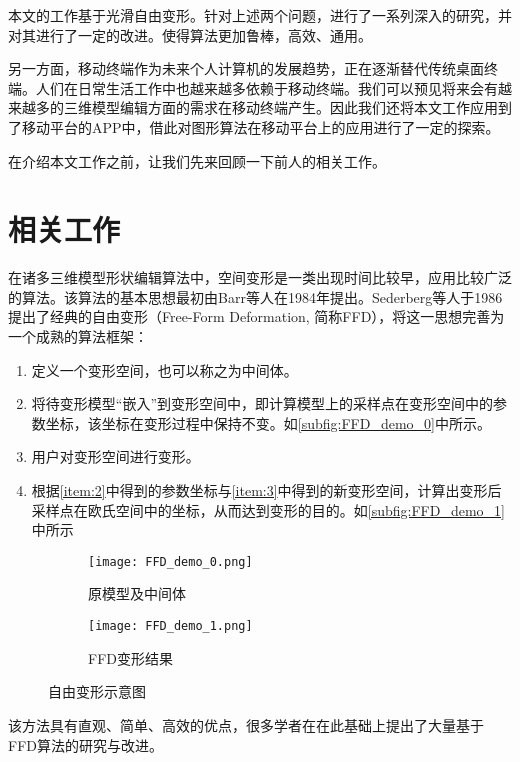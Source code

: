     本文的工作基于光滑自由变形\cite{Cui15}。针对上述两个问题，进行了一系列深入的研究，并对其进行了一定的改进。使得算法更加鲁棒，高效、通用。

    另一方面，移动终端作为未来个人计算机的发展趋势，正在逐渐替代传统桌面终端。人们在日常生活工作中也越来越多依赖于移动终端。我们可以预见将来会有越来越多的三维模型编辑方面的需求在移动终端产生。因此我们还将本文工作应用到了移动平台的APP中，借此对图形算法在移动平台上的应用进行了一定的探索。

    在介绍本文工作之前，让我们先来回顾一下前人的相关工作。


\section{相关工作}
    在诸多三维模型形状编辑算法中，空间变形是一类出现时间比较早，应用比较广泛的算法。该算法的基本思想最初由Barr等人\cite{Barr84}在1984年提出。Sederberg等人\cite{Sederberg86}于1986提出了经典的自由变形（Free-Form Deformation, 简称FFD），将这一思想完善为一个成熟的算法框架：
\begin{enumerate}
    \item 定义一个变形空间，也可以称之为中间体。
    \item 将待变形模型“嵌入”到变形空间中，即计算模型上的采样点在变形空间中的参数坐标，该坐标在变形过程中保持不变。如\autoref{subfig:FFD_demo_0}中所示。\label{item:2}
	\item 用户对变形空间进行变形。\label{item:3}
    \item 根据\ref{item:2}中得到的参数坐标与\ref{item:3}中得到的新变形空间，计算出变形后采样点在欧氏空间中的坐标，从而达到变形的目的。如\autoref{subfig:FFD_demo_1}中所示
\end{enumerate}


\begin{figure}[htbp]
	\centering
	\begin{subfigure}[b]{.4\textwidth}
		\centering
		\texttt{[image: FFD\_demo\_0.png]}
		\caption{原模型及中间体}\label{subfig:FFD_demo_0}
	\end{subfigure}
	\quad
	\begin{subfigure}[b]{.4\textwidth}
		\centering
		\texttt{[image: FFD\_demo\_1.png]}
		\caption{FFD变形结果}\label{subfig:FFD_demo_1}
	\end{subfigure}
    \caption{自由变形示意图}\label{fig:FFD_demo}
\end{figure}

    该方法具有直观、简单、高效的优点，很多学者在在此基础上提出了大量基于FFD算法的研究与改进。

